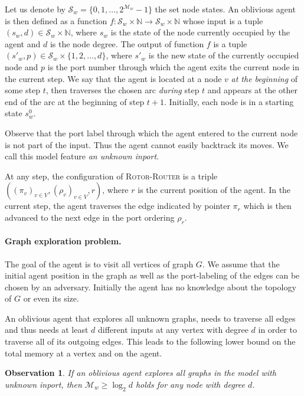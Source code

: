 \documentclass{article}[11pt,letter]
\newtheorem{observation}[definition]{Observation}
\newtheorem{observation}[definition]{Observation}
\newcommand{\RR}{{\textsc{Rotor-Router}}\xspace}
\newcommand{\state}{\mathcal{S}}
\newcommand{\mem}{\mathcal{M}}
\begin{document}
Let us denote by $\state_w = \{0,1,\dots,2^{\mem_w}-1\}$ the set node states. An oblivious agent is then defined as a function $f:\state_w \times \mathbb{N} \rightarrow \state_w \times \mathbb{N}$ whose input is a tuple $(s_w,d) \in \state_w \times \mathbb{N}$, where $s_w$ is the state of the node currently occupied by the agent and $d$ is the node degree. The output of function $f$ is a tuple $(s'_w,p) \in \state_w \times \{1,2,\dots,d\}$, where $s'_w$ is the new state of the currently occupied node and $p$ is the port number through which the agent exits the current node in the current step. We say that the agent is located at a node $v$ \textit{at the beginning} of some step $t$, then traverses the chosen arc \textit{during} step $t$ and appears at the other end of the arc at the beginning of step $t+1$. Initially, each node is in a starting state $s^{0}_w$. 


Observe that the port label through which the agent entered to the current node is not part of the input. Thus the agent cannot easily backtrack its moves. We call this model feature \textit{an unknown inport}. 

At any step, the configuration of \RR is a triple $((\pi_v)_{v\in V},(\rho_v)_{v\in V},r)$, where $r$ is the current position of the agent. In the current step, the agent traverses the edge indicated by pointer $\pi_r$ which is then advanced to the next edge in the port ordering $\rho_r$.

\paragraph{Graph exploration problem.}
The goal of the agent is to visit all vertices of graph $G$. We assume that the initial agent position in the graph as well as the port-labeling of the edges can be chosen by an adversary. Initially the agent has no knowledge about the topology of $G$ or even its size. 



An oblivious agent that explores all unknown graphs, needs to traverse all edges and thus needs at least $d$ different inputs at any vertex with degree $d$ in order to traverse all of its outgoing edges. This leads to the following lower bound on the total memory at a vertex and on the agent.

\begin{observation}
\label{trivial_lower_bound}
If an oblivious agent explores all graphs in the model with unknown inport, then $\mem_w \geq \log_2 d$ holds for any node with degree $d$.
\end{observation}
\end{document}
